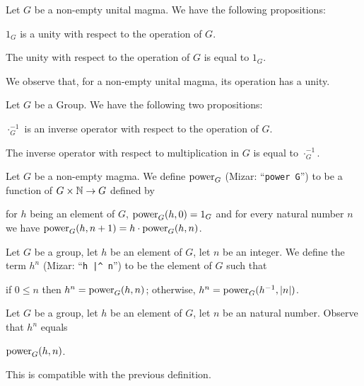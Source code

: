 Let $G$ be a non-empty unital magma. We have the following propositions:
\begin{thm}
\item\label{group1:21} $1_{G}$ is a unity with respect to the operation
  of $G$.
\item\label{group1:22} The unity with respect to the operation of $G$ is
  equal to $1_{G}$.
\end{thm}

We observe that, for a non-empty unital magma, its operation has a
unity.

Let $G$ be a Group. We have the following two propositions:
\begin{thm}
\item\label{group1:23} $\cdot_{G}^{-1}$ is an inverse operator with
  respect to the operation of $G$.
\item\label{group1:24} The inverse operator with respect to
  multiplication in $G$ is equal to $\cdot_{G}^{-1}$.
\end{thm}

\begin{definition}
Let $G$ be a non-empty magma. We define $\operatorname{power}_{G}$ (Mizar:
``\verb#power G#'') to be a function of
$G\times\mathbb{N}\to G$ defined by
\begin{defn}
\item for $h$ being an element of $G$, $\operatorname{power}_{G}(h,0)=1_{G}$ and for
  every natural number $n$ we have $\operatorname{power}_{G}(h,n+1)=h\cdot\operatorname{power}_{G}(h,n)$.
\end{defn}
\end{definition}

\begin{definition}
Let $G$ be a group, let $h$ be an element of $G$, let $n$ be an integer.
We define the term $h^{n}$ (Mizar: ``\verb#h |^ n#'') to be the element
of $G$ such that
\begin{defn}
\item if $0\leq n$ then $h^{n}=\operatorname{power}_{G}(h,n)$; otherwise, $h^{n}=\operatorname{power}_{G}(h^{-1},|n|)$.
\end{defn}
\end{definition}

\begin{definition}
Let $G$ be a group, let $h$ be an element of $G$, let $n$ be an natural
number. Observe that $h^{n}$ equals
\begin{defn}
\item $\operatorname{power}_{G}(h,n)$.
\end{defn}
This is compatible with the previous definition.
\end{definition}

